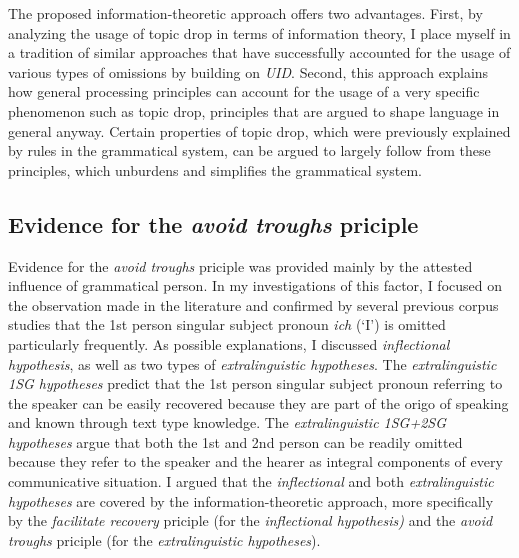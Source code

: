 The proposed information-theoretic approach offers two advantages.
First, by analyzing the usage of topic drop in terms of information theory, I place myself in a tradition of similar approaches that have successfully accounted for the usage of various types of omissions by building on \textit{UID}.
Second, this approach explains how general processing principles can account for the usage of a very specific phenomenon such as topic drop, principles that are argued to shape language in general anyway. 
Certain properties of topic drop, which were previously explained by rules in the grammatical system, can be argued to largely follow from these principles, which unburdens and simplifies the grammatical system.

\subsection{Evidence for the \textit{avoid troughs} priciple}
Evidence for the \textit{avoid troughs} priciple was provided mainly by the attested influence of  grammatical person.
In my investigations of this factor, I focused on the observation made in the literature and confirmed by several previous corpus studies  that the 1st person singular subject pronoun \textit{ich} (`I') is omitted particularly frequently.
As possible explanations, I discussed  \textit{inflectional hypothesis}, as well as two types of \textit{extralinguistic hypotheses}.
The \textit{extralinguistic 1SG hypotheses} predict that the 1st person singular subject pronoun referring to the speaker can be easily recovered  because they are part of the origo of speaking and known through text type knowledge. 
The \textit{extralinguistic 1SG+2SG hypotheses} argue that both the 1st and 2nd person can be readily omitted because they refer to the speaker and the hearer as integral components of every communicative situation.
I argued that the \textit{inflectional} and both \textit{extralinguistic hypotheses} are covered by the information-theoretic approach, more specifically by the \textit{facilitate recovery} priciple  (for the \textit{inflectional hypothesis)} and the \textit{avoid troughs} priciple (for the \textit{extralinguistic hypotheses}).

